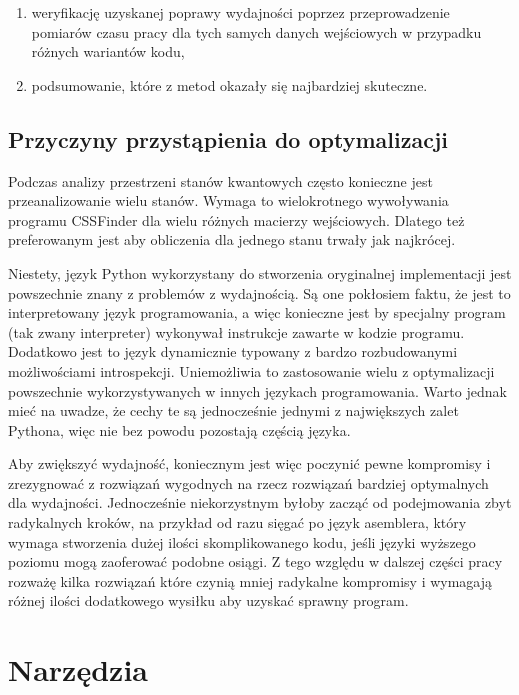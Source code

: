 \documentclass[11pt, a4paper]{article}
\begin{document}
\begin{sloppypar}
\begin{enumerate}
      \item weryfikację uzyskanej poprawy wydajności poprzez przeprowadzenie pomiarów czasu
        pracy dla tych samych danych wejściowych w przypadku różnych wariantów kodu,

      \item podsumowanie, które z metod okazały się najbardziej skuteczne.
    \end{enumerate}

    \subsection{Przyczyny przystąpienia do optymalizacji}
    Podczas analizy przestrzeni stanów kwantowych często konieczne jest przeanalizowanie
    wielu stanów. Wymaga to wielokrotnego wywoływania programu CSSFinder dla wielu różnych
    macierzy wejściowych. Dlatego też preferowanym jest aby obliczenia dla jednego stanu
    trwały jak najkrócej.

    Niestety, język Python wykorzystany do stworzenia oryginalnej implementacji jest powszechnie
    znany z problemów z wydajnością\cite{srinath2017python}. Są one pokłosiem faktu, że
    jest to interpretowany język programowania, a więc konieczne jest by specjalny program
    (tak zwany interpreter) wykonywał instrukcje zawarte w kodzie programu. Dodatkowo
    jest to język dynamicznie typowany z bardzo rozbudowanymi możliwościami introspekcji.
    Uniemożliwia to zastosowanie wielu z optymalizacji powszechnie wykorzystywanych w innych
    językach programowania. Warto jednak mieć na uwadze, że cechy te są jednocześnie jednymi
    z największych zalet Pythona, więc nie bez powodu pozostają częścią języka.

    Aby zwiększyć wydajność, koniecznym jest więc poczynić pewne kompromisy i zrezygnować
    z rozwiązań wygodnych na rzecz rozwiązań bardziej optymalnych dla wydajności.
    Jednocześnie niekorzystnym byłoby zacząć od podejmowania zbyt radykalnych kroków, na
    przykład od razu sięgać po język asemblera, który wymaga stworzenia dużej ilości
    skomplikowanego kodu, jeśli języki wyższego poziomu mogą zaoferować podobne osiągi.
    Z tego względu w dalszej części pracy rozważę kilka rozwiązań które czynią mniej
    radykalne kompromisy i wymagają różnej ilości dodatkowego wysiłku aby uzyskać
    sprawny program.

    \section{Narzędzia}

\end{sloppypar}
\end{document}
